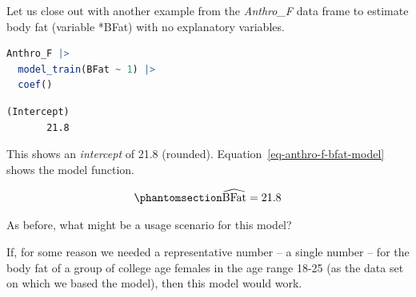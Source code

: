 \documentclass[
  12pt,
  letterpaper,
  DIV=11,
  numbers=noendperiod]{scrreprt}
\begin{document}
Let us close out with another example from the \emph{Anthro\_F} data
frame to estimate body fat (variable *BFat) with no explanatory
variables.

\begin{lstlisting}[language=R]
Anthro_F |> 
  model_train(BFat ~ 1) |> 
  coef()
\end{lstlisting}

\begin{lstlisting}
(Intercept) 
       21.8 
\end{lstlisting}

This shows an \emph{intercept} of 21.8 (rounded).
Equation~\ref{eq-anthro-f-bfat-model} shows the model function.

\begin{equation}\phantomsection\label{eq-anthro-f-bfat-model}{
\widehat{\text{BFat}} = 21.8
}\end{equation}

\begin{tcolorbox}[enhanced jigsaw, colback=white, leftrule=.75mm, toprule=.15mm, bottomtitle=1mm, breakable, coltitle=black, toptitle=1mm, title={Quick Check}, opacitybacktitle=0.6, colbacktitle=quarto-callout-note-color!10!white, arc=.35mm, left=2mm, colframe=quarto-callout-note-color-frame, titlerule=0mm, rightrule=.15mm, bottomrule=.15mm, opacityback=0]

As before, what might be a usage scenario for this model?

\end{tcolorbox}

\begin{tcolorbox}[enhanced jigsaw, colback=white, leftrule=.75mm, toprule=.15mm, bottomtitle=1mm, breakable, coltitle=black, toptitle=1mm, title={Suggested answer}, opacitybacktitle=0.6, colbacktitle=quarto-callout-note-color!10!white, arc=.35mm, left=2mm, colframe=quarto-callout-note-color-frame, titlerule=0mm, rightrule=.15mm, bottomrule=.15mm, opacityback=0]

If, for some reason we needed a representative number -- a single number
-- for the body fat of a group of college age females in the age range
18-25 (as the data set on which we based the model), then this model
would work.

\end{tcolorbox}
\end{document}
